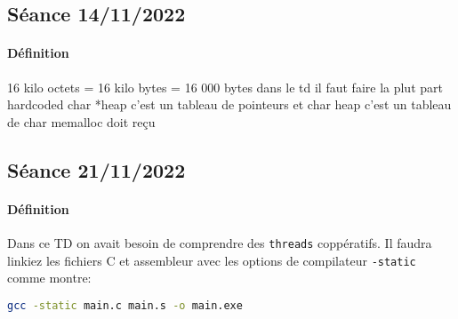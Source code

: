 \documentclass{article}
\begin{document}
\newpage\subsection{Séance 14/11/2022}
\paragraph{Définition}16 kilo octets = 16 kilo bytes = 16 000 bytes
dans le td il faut faire la plut part hardcoded
char *heap c'est un tableau de pointeurs et char heap c'est un tableau de char
memalloc doit reçu

\newpage\subsection{Séance 21/11/2022}
\paragraph{Définition}Dans ce TD on avait besoin de comprendre des \texttt{threads} coppératifs. Il faudra linkiez les fichiers C et assembleur avec les options de compilateur \texttt{-static} comme montre:
\begin{scriptsize}\mycode
    \begin{lstlisting}[language=Bash]
        gcc -static main.c main.s -o main.exe
    \end{lstlisting}
\end{scriptsize}
\end{document}
